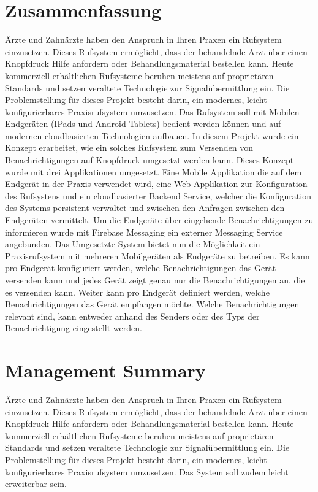 \section*{Zusammenfassung}

Ärzte und Zahnärzte haben den Anspruch in Ihren Praxen ein Rufsystem einzusetzen.
Dieses Rufsystem ermöglicht, dass der behandelnde Arzt über einen Knopfdruck Hilfe anfordern oder Behandlungsmaterial bestellen kann.
Heute kommerziell erhältlichen Rufsysteme beruhen meistens auf proprietären Standards und setzen veraltete Technologie zur Signalübermittlung ein. \cite{TODO: Add Citation!}
Die Problemstellung für dieses Projekt besteht darin, ein modernes, leicht konfigurierbares Praxisrufsystem umzusetzen.
Das Rufsystem soll mit Mobilen Endgeräten (IPads und Android Tablets) bedient werden können und auf modernen cloudbasierten Technologien aufbauen.
In diesem Projekt wurde ein Konzept erarbeitet, wie ein solches Rufsystem zum Versenden von Benachrichtigungen auf Knopfdruck umgesetzt werden kann.
Dieses Konzept wurde mit drei Applikationen umgesetzt.
Eine Mobile Applikation die auf dem Endgerät in der Praxis verwendet wird, eine Web Applikation zur Konfiguration des Rufsystens
und ein cloudbasierter Backend Service, welcher die Konfiguration des Systems persistent verwaltet und zwischen den Anfragen zwischen den Endgeräten vermittelt.
Um die Endgeräte über eingehende Benachrichtigungen zu informieren wurde mit Firebase Messaging ein externer Messaging Service angebunden.
Das Umgesetzte System bietet nun die Möglichkeit ein Praxisrufsystem mit mehreren Mobilgeräten als Endgeräte zu betreiben.
Es kann pro Endgerät konfiguriert werden, welche Benachrichtigungen das Gerät versenden kann und jedes Gerät zeigt genau nur die Benachrichtigungen an, die es versenden kann.
Weiter kann pro Endgerät definiert werden, welche Benachrichtigungen das Gerät empfangen möchte.
Welche Benachrichtigungen relevant sind, kann entweder anhand des Senders oder des Typs der Benachrichtigung eingestellt werden.



\clearpage
\section*{Management Summary}

Ärzte und Zahnärzte haben den Anspruch in Ihren Praxen ein Rufsystem einzusetzen.
Dieses Rufsystem ermöglicht, dass der behandelnde Arzt über einen Knopfdruck Hilfe anfordern oder Behandlungsmaterial bestellen kann.
Heute kommerziell erhältlichen Rufsysteme beruhen meistens auf proprietären Standards und setzen veraltete Technologie zur Signalübermittlung ein. \cite{TODO: Add Citation!}
Die Problemstellung für dieses Projekt besteht darin, ein modernes, leicht konfigurierbares Praxisrufsystem umzusetzen.
Das System soll zudem leicht erweiterbar sein.

